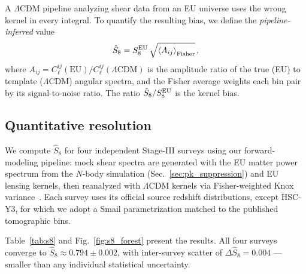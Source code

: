 \documentclass[a4paper,fleqn]{cas-dc}
\begin{document}
A $\Lambda$CDM pipeline analyzing shear data from an EU
universe uses the wrong kernel in every integral. To
quantify the resulting bias, we define the
\textit{pipeline-inferred} value
\begin{equation}
\hat{S}_8 = S_8^{\rm EU}\,
  \sqrt{\left\langle A_{ij} \right\rangle_{\rm Fisher}}\,,
\label{eq:shat}
\end{equation}
where $A_{ij} = C_\ell^{ij}(\text{EU}) /
C_\ell^{ij}(\Lambda\text{CDM})$ is the amplitude ratio
of the true (EU) to template ($\Lambda$CDM) angular spectra,
and the Fisher average weights each bin pair by its
signal-to-noise ratio. The ratio $\hat{S}_8 / S_8^{\rm EU}$
is the kernel bias.

\subsection{Quantitative resolution}
\label{sec:s8_resolution}

We compute $\hat{S}_8$ for four independent Stage-III
surveys using our forward-modeling pipeline:
mock shear spectra are generated with the EU matter power
spectrum from the $N$-body simulation
(Sec.~\ref{sec:pk_suppression}) and EU lensing kernels,
then reanalyzed with $\Lambda$CDM kernels via
Fisher-weighted Knox variance~\cite{knox1995}.
Each survey uses its official source redshift distributions,
except HSC-Y3, for which we adopt a Smail
parametrization matched to the published
tomographic bins.

Table~\ref{tab:s8} and Fig.~\ref{fig:s8_forest} present the results. All four surveys
converge to $\hat{S}_8 \approx 0.794 \pm 0.002$, with
inter-survey scatter of $\Delta\hat{S}_8 = 0.004$ ---
smaller than any individual statistical uncertainty.
\end{document}
